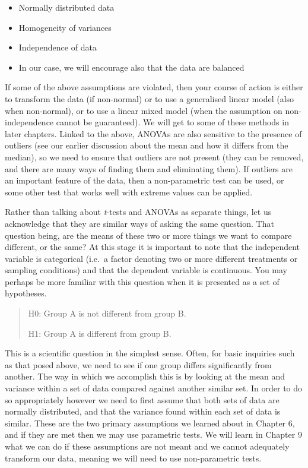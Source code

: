\documentclass[english,10pt,a4paper,oneside]{book}
\providecommand{\tightlist}{%
  \setlength{\itemsep}{0pt}\setlength{\parskip}{0pt}}
\theoremstyle{definition}
\theoremstyle{definition}
\theoremstyle{definition}
\theoremstyle{remark}
\begin{document}
\begin{itemize}
\tightlist
\item
  Normally distributed data
\item
  Homogeneity of variances
\item
  Independence of data
\item
  In our case, we will encourage also that the data are balanced
\end{itemize}

If some of the above assumptions are violated, then your course of
action is either to transform the data (if non-normal) or to use a
generalised linear model (also when non-normal), or to use a linear
mixed model (when the assumption on non-independence cannot be
guaranteed). We will get to some of these methods in later chapters.
Linked to the above, ANOVAs are also sensitive to the presence of
outliers (see our earlier discussion about the mean and how it differs
from the median), so we need to ensure that outliers are not present
(they can be removed, and there are many ways of finding them and
eliminating them). If outliers are an important feature of the data,
then a non-parametric test can be used, or some other test that works
well with extreme values can be applied.

Rather than talking about \emph{t}-tests and ANOVAs as separate things,
let us acknowledge that they are similar ways of asking the same
question. That question being, are the means of these two or more things
we want to compare different, or the same? At this stage it is important
to note that the independent variable is categorical (i.e.~a factor
denoting two or more different treatments or sampling conditions) and
that the dependent variable is continuous. You may perhaps be more
familiar with this question when it is presented as a set of hypotheses.

\begin{quote}
H0: Group A is not different from group B.

H1: Group A is different from group B.
\end{quote}

This is a scientific question in the simplest sense. Often, for basic
inquiries such as that posed above, we need to see if one group differs
significantly from another. The way in which we accomplish this is by
looking at the mean and variance within a set of data compared against
another similar set. In order to do so appropriately however we need to
first assume that both sets of data are normally distributed, and that
the variance found within each set of data is similar. These are the two
primary assumptions we learned about in Chapter 6, and if they are met
then we may use parametric tests. We will learn in Chapter 9 what we can
do if these assumptions are not meant and we cannot adequately transform
our data, meaning we will need to use non-parametric tests.
\end{document}
